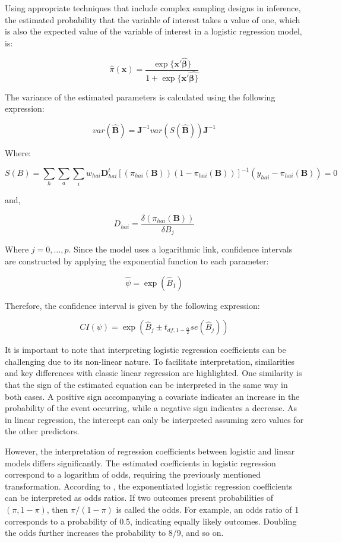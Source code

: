 \documentclass[
  12pt,
]{book}
\begin{document}
Using appropriate techniques that include complex sampling designs in inference, the estimated probability that the variable of interest takes a value of one, which is also the expected value of the variable of interest in a logistic regression model, is:

\[
\hat{\pi}(\textbf{x})= \frac{\exp\{\textbf{x}'\hat{\boldsymbol{\beta}}\}}{1+\exp\{\textbf{x}'\hat{\boldsymbol{\beta}\}}}
\]

The variance of the estimated parameters is calculated using the following expression:

\[
var\left(\boldsymbol{\hat{B}}\right)=\boldsymbol{J}^{-1}var\left(S\left(\hat{\boldsymbol{B}}\right)\right)\boldsymbol{J}^{-1}
\]

Where:

\[
S\left(B\right)=\sum_{h}\sum_{a}\sum_{i}w_{hai}\boldsymbol{D}_{hai}^{t}\left[\left(\pi_{hai}\left(\boldsymbol{B}\right)\right)\left(1-\pi_{hai}\left(\boldsymbol{B}\right)\right)\right]^{-1}\left(y_{hai}-\pi_{hai}\left(\boldsymbol{B}\right)\right)=0
\]

and,

\[
D_{hai} = \frac{\delta\left(\pi_{hai}\left(\boldsymbol{B}\right)\right)}{\delta B_{j}}
\]

Where \(j=0,\dots,p\). Since the model uses a logarithmic link, confidence intervals are constructed by applying the exponential function to each parameter:

\[
\hat{\psi}=\exp\left(\hat{B}_{1}\right)
\]

Therefore, the confidence interval is given by the following expression:

\[
CI\left(\psi\right)=\exp\left(\hat{B}_{j}\pm t_{df,1-\frac{\alpha}{2}}se\left(\hat{B}_{j}\right)\right)
\]

It is important to note that interpreting logistic regression coefficients can be challenging due to its non-linear nature. To facilitate interpretation, similarities and key differences with classic linear regression are highlighted. One similarity is that the sign of the estimated equation can be interpreted in the same way in both cases. A positive sign accompanying a covariate indicates an increase in the probability of the event occurring, while a negative sign indicates a decrease. As in linear regression, the intercept can only be interpreted assuming zero values for the other predictors.

However, the interpretation of regression coefficients between logistic and linear models differs significantly. The estimated coefficients in logistic regression correspond to a logarithm of odds, requiring the previously mentioned transformation. According to \citet{gelmanhill2019}, the exponentiated logistic regression coefficients can be interpreted as odds ratios. If two outcomes present probabilities of \((\pi,1-\pi)\), then \(\pi/(1-\pi)\) is called the odds. For example, an odds ratio of 1 corresponds to a probability of 0.5, indicating equally likely outcomes. Doubling the odds further increases the probability to 8/9, and so on.
\end{document}
